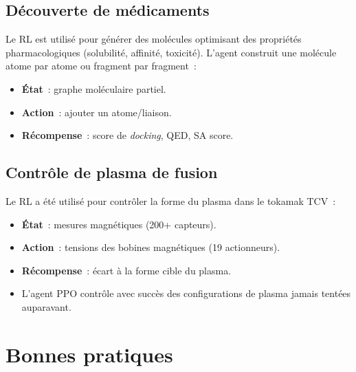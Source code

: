 \subsection{D\'ecouverte de m\'edicaments}

\begin{exemple}
Le RL est utilis\'e pour g\'en\'erer des mol\'ecules optimisant des propri\'et\'es
pharmacologiques (solubilit\'e, affinit\'e, toxicit\'e). L'agent construit
une mol\'ecule atome par atome ou fragment par fragment~:
\begin{itemize}
    \item \textbf{\'Etat}~: graphe mol\'eculaire partiel.
    \item \textbf{Action}~: ajouter un atome/liaison.
    \item \textbf{R\'ecompense}~: score de \emph{docking}, QED, SA score.
\end{itemize}
\end{exemple}

\subsection{Contr\^ole de plasma de fusion}

\begin{exemple}
Le RL a \'et\'e utilis\'e pour contr\^oler la forme du plasma dans le tokamak
TCV~:
\begin{itemize}
    \item \textbf{\'Etat}~: mesures magn\'etiques (200+ capteurs).
    \item \textbf{Action}~: tensions des bobines magn\'etiques (19 actionneurs).
    \item \textbf{R\'ecompense}~: \'ecart \`a la forme cible du plasma.
    \item L'agent PPO contr\^ole avec succ\`es des configurations de plasma
    jamais tent\'ees auparavant.
\end{itemize}
\end{exemple}

\section{Bonnes pratiques}

